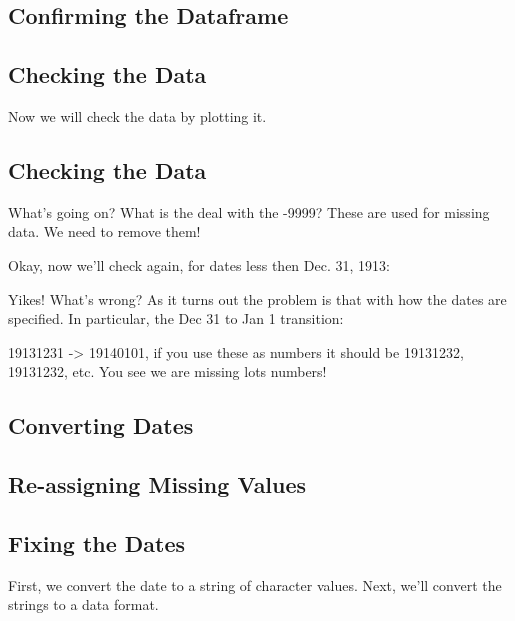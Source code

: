 \documentclass{article}\usepackage[]{graphicx}\usepackage[]{color}
\begin{document}
\subsection{Confirming the Dataframe}


\subsection{Checking the Data}

Now we will check the data by plotting it.



\subsection{Checking the Data}

What's going on?  What is the deal with the -9999? These are used for missing data. We need to remove them!




Okay, now we'll check again, for dates less then Dec. 31, 1913:




Yikes! What's wrong? As it turns out the problem is that with how the dates are specified. In particular, the Dec 31 to Jan 1 transition: 

19131231 -> 19140101, if you use these as numbers it should be 19131232, 19131232, etc. You see we are missing lots numbers!



\subsection{Converting Dates}

\subsection{Re-assigning Missing Values}

\subsection{Fixing the Dates}

First, we convert the date to a string of character values. Next, we'll convert the strings to a data format. 
\end{document}
